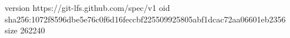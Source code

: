 version https://git-lfs.github.com/spec/v1
oid sha256:1072f8596dbe5e76c0f6d16feccbf225509925805abf1dcac72aa06601eb2356
size 262240
